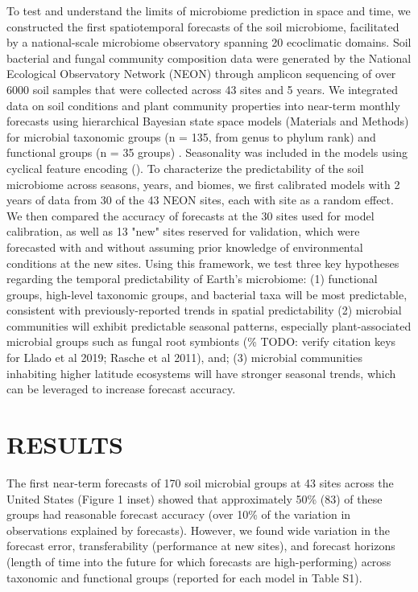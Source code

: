 \documentclass[11pt]{article}
\begin{document}
To test and understand the limits of microbiome prediction in space and time, we constructed the first spatiotemporal forecasts of the soil microbiome, facilitated by a national-scale microbiome observatory spanning 20 ecoclimatic domains. Soil bacterial and fungal community composition data were generated by the National Ecological Observatory Network (NEON) through amplicon sequencing of over 6000 soil samples that were collected across 43 sites and 5 years. We integrated data on soil conditions and plant community properties into near-term monthly forecasts using hierarchical Bayesian state space models (Materials and Methods) for microbial taxonomic groups (n = 135, from genus to phylum rank) and functional groups (n = 35 groups) \cite{averill_soil_2021}. Seasonality was included in the models using cyclical feature encoding (\cite{stolwijk_studying_1999}). To characterize the predictability of the soil microbiome across seasons, years, and biomes, we first calibrated models with 2 years of data from 30 of the 43 NEON sites, each with site as a random effect. We then compared the accuracy of forecasts at the 30 sites used for model calibration, as well as 13 "new" sites reserved for validation, which were forecasted with and without assuming prior knowledge of environmental conditions at the new sites. Using this framework, we test three key hypotheses regarding the temporal predictability of Earth's microbiome: (1) functional groups, high-level taxonomic groups, and bacterial taxa will be most predictable, consistent with previously-reported trends in spatial predictability \cite{averill_soil_2021} (2) microbial communities will exhibit predictable seasonal patterns, especially plant-associated microbial groups such as fungal root symbionts (\% TODO: verify citation keys for Llado et al 2019; Rasche et al 2011), and; (3) microbial communities inhabiting higher latitude ecosystems will have stronger seasonal trends, which can be leveraged to increase forecast accuracy.

\section{RESULTS}

The first near-term forecasts of 170 soil microbial groups at 43 sites across the United States (Figure 1 inset) showed that approximately 50\% (83) of these groups had reasonable forecast accuracy (over 10\% of the variation in observations explained by forecasts). However, we found wide variation in the forecast error, transferability (performance at new sites), and forecast horizons (length of time into the future for which forecasts are high-performing) across taxonomic and functional groups (reported for each model in Table S1).  \\
\end{document}
